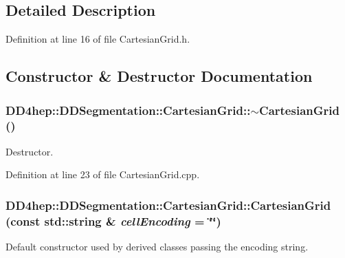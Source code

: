 \subsection{Detailed Description}


Definition at line 16 of file CartesianGrid.h.

\subsection{Constructor \& Destructor Documentation}
\hypertarget{class_d_d4hep_1_1_d_d_segmentation_1_1_cartesian_grid_a47e47796738c185cae95da0beb464913}{
\subsubsection[{$\sim$CartesianGrid}]{\setlength{\rightskip}{0pt plus 5cm}DD4hep::DDSegmentation::CartesianGrid::$\sim$CartesianGrid ()}}
\label{class_d_d4hep_1_1_d_d_segmentation_1_1_cartesian_grid_a47e47796738c185cae95da0beb464913}


Destructor. 

Definition at line 23 of file CartesianGrid.cpp.\hypertarget{class_d_d4hep_1_1_d_d_segmentation_1_1_cartesian_grid_a12123b75c013fb62deb0877d923ba1e7}{
\subsubsection[{CartesianGrid}]{\setlength{\rightskip}{0pt plus 5cm}DD4hep::DDSegmentation::CartesianGrid::CartesianGrid (const std::string \& {\em cellEncoding} = {\ttfamily \char`\"{}\char`\"{}})}}
\label{class_d_d4hep_1_1_d_d_segmentation_1_1_cartesian_grid_a12123b75c013fb62deb0877d923ba1e7}


Default constructor used by derived classes passing the encoding string. 

